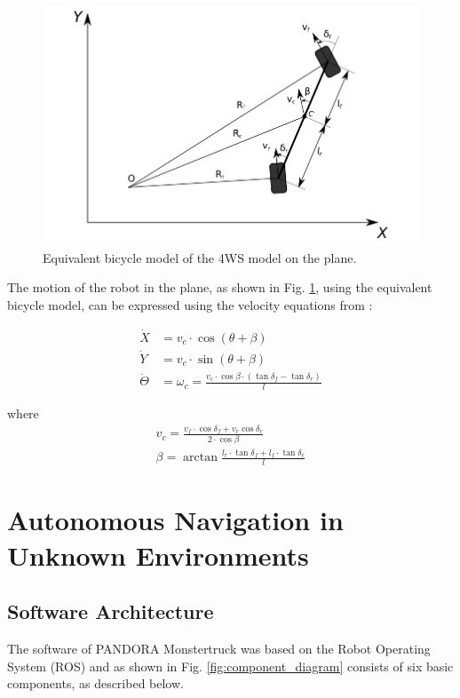 \documentclass[conference]{IEEEtran}
\begin{document}
\begin{figure}[!ht]
	\centering
	\includegraphics[width=\linewidth]{Figures/4ws_xy_plane.png}%
	\caption{Equivalent bicycle model of the 4WS model on the plane.}
	\label{fig:4ws_xy_plane}
\end{figure}

The motion of the robot in the plane, as shown in Fig. \ref{fig:4ws_xy_plane}, using the equivalent bicycle model, can be expressed using the velocity equations from \cite{4ws_trajectory_planning}:

\begin{align}
	\dot X &= v_c \cdot \cos(\theta + \beta)
	\label{eq:x_dot}\\
	\dot Y &= v_c \cdot \sin(\theta + \beta)
	\label{eq:y_dot}\\
	\dot \Theta &= \omega_c = \frac{v_c \cdot \cos{\beta} \cdot (\tan{\delta_f - \tan{\delta_r}})}{l}
	\label{eq:th_dot}
\end{align}

\noindent
where 
\begin{align}
	v_c = \frac{v_f \cdot \cos{\delta_f} + v_r \cos{\delta_r}}{2 \cdot \cos{\beta}}
	\label{eq:v_c_f_r}\\[0.2cm]
	\beta = \arctan{\frac{l_r \cdot \tan{\delta_f} + l_f \cdot \tan{\delta_r}}{l}}
	\label{eq:beta}
\end{align}

\bigskip
\section{Autonomous Navigation in Unknown Environments} \label{sec:autonav}
\subsection{Software Architecture}
The software of PANDORA Monstertruck was based on the Robot Operating System (ROS) and as shown in Fig. \ref{fig:component_diagram} consists of six basic components, as described below.
\end{document}
